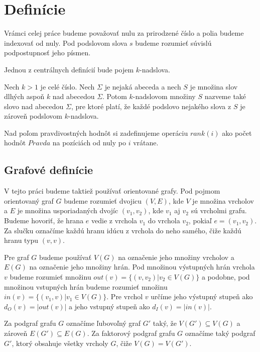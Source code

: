 \section{Definície}

Vrámci celej práce budeme považovať nulu za prirodzené číslo a polia budeme indexovať
od nuly. Pod podslovom slova $s$ budeme rozumieť súvislú podpostupnosť jeho písmen.

Jednou z centrálnych definícií bude pojem $k$-nadslova.

\begin{defn}
    Nech $k > 1$ je celé číslo. Nech $\Sigma$ je nejaká abeceda a nech $S$ je množina
    slov dlhých aspoň $k$ nad abecedou $\Sigma$. Potom $k$-nadslovom množiny $S$ nazveme také slovo
    nad abecedou $\Sigma$, pre ktoré platí, že každé podslovo nejakého slova z $S$ je
    zároveň podslovom $k$-nadslova.
\end{defn}

Nad poľom pravdivostných hodnôt si zadefinujeme operáciu $rank(i)$ ako počet hodnôt $Pravda$
na pozíciách od nuly po $i$ vrátane.

\subsection{Grafové definície}

V tejto práci budeme taktiež používať orientované grafy. Pod pojmom orientovaný graf $G$ budeme
rozumieť dvojicu $(V, E)$, kde $V$ je množina vrcholov a $E$ je množina usporiadaných
dvojíc $(v_1, v_2)$, kde $v_1$ aj $v_2$ sú vrcholmi grafu. Budeme hovoriť, že hrana $e$ vedie
z vrchola $v_1$ do vrchola $v_2$, pokiaľ $e = (v_1, v_2)$. Za slučku označíme každú hranu idúcu z vrchola
do neho samého, čiže každú hranu typu $(v, v)$.

Pre graf $G$ budeme používať $V(G)$ na označenie jeho množiny vrcholov a $E(G)$ na označenie jeho
množiny hrán. Pod množinou výstupných hrán
vrchola $v$ budeme rozumieť množinu $out(v) = \{ (v, v_2) | v_2 \in V(G) \}$ a podobne,
pod množinou vstupných hrán budeme rozumieť množinu $in(v) = \{ (v_1, v) | v_1 \in V(G) \}$.
Pre vrchol $v$ určíme jeho výstupný stupeň ako $d_O(v) = |out(v)|$ a jeho vstupný stupeň ako $d_I(v) = |in(v)|$.

Za podgraf grafu $G$ označíme ľubovoľný graf $G'$ taký, že $V(G') \subseteq V(G)$ a zároveň $E(G') \subseteq E(G)$.
Za faktorový podgraf grafu $G$ označíme taký podgraf $G'$, ktorý obsahuje všetky vrcholy $G$, čiže
$V(G) = V(G')$.

